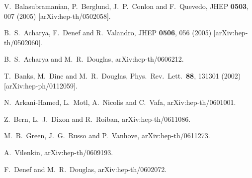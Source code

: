 \documentclass[aps,amsfonts]{ar2e}
\begin{document}
\begin{thebibliography}{999}
  V.~Balasubramanian, P.~Berglund, J.~P.~Conlon and F.~Quevedo,
  JHEP {\bf 0503}, 007 (2005)
  [arXiv:hep-th/0502058].

  B.~S.~Acharya, F.~Denef and R.~Valandro,
  JHEP {\bf 0506}, 056 (2005)
  [arXiv:hep-th/0502060].

  B.~S.~Acharya and M.~R.~Douglas,
  arXiv:hep-th/0606212.

  T.~Banks, M.~Dine and M.~R.~Douglas,
  Phys.\ Rev.\ Lett.\  {\bf 88}, 131301 (2002)
  [arXiv:hep-ph/0112059].

  N.~Arkani-Hamed, L.~Motl, A.~Nicolis and C.~Vafa,
  arXiv:hep-th/0601001.

  Z.~Bern, L.~J.~Dixon and R.~Roiban,
  arXiv:hep-th/0611086.

  M.~B.~Green, J.~G.~Russo and P.~Vanhove,
  arXiv:hep-th/0611273.

\iffalse
\bibitem{Vilenkin:1983xq}
  A.~Vilenkin,
  Phys.\ Rev.\ D {\bf 27}, 2848 (1983).

\bibitem{Linde:1986fc}
  A.~D.~Linde,
  Mod.\ Phys.\ Lett.\ A {\bf 1}, 81 (1986).

\bibitem{Linde:1986fd}
  A.~D.~Linde,
  Phys.\ Lett.\ B {\bf 175}, 395 (1986).
\fi

  A.~Vilenkin,
  arXiv:hep-th/0609193.

  F.~Denef and M.~R.~Douglas,
  arXiv:hep-th/0602072.


\end{thebibliography}
\end{document}
